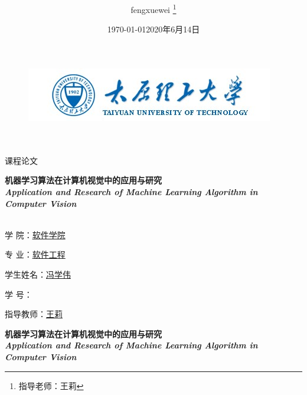 \documentclass[UTF8,a4paper,10pt,nocolorlinks]{ctexart}
\title{\textbf{}}
\author{ fengxuewei \thanks{指导老师：王莉} }
\date{\today}
\DeclareRobustCommand{\sanhao}{\fontsize{16pt}{\baselineskip}\selectfont}  %
\begin{document}
\begin{figure}[t]
    \parbox[b]{1cm}{
        \includegraphics[width=\textwidth]{TYUT.jpg}
        }
\end{figure}

    \begin{center}
        \quad \\
        \quad \\
        \heiti \fontsize{45}{17} 课\quad 程\quad 论\quad 文
        \vskip 3.5cm	
        \begin{center}
            \huge{\textbf{机器学习算法在计算机视觉中的应用与研究}}\\
            \emph{\Large{\textbf{Application and Research of Machine Learning Algorithm in Computer Vision}}}\\
        \end{center}
    \end{center}
        \vskip 3.5cm
    \begin{center}
        \songti \fontsize{15}{15}
        \doublespacing
        \quad
        \sanhao \\
        学\hspace{1cm}  院：\underline{\qquad 软件学院 \quad}

        专\hspace{1cm}  业：\underline{\qquad 软件工程 \quad} 

        学生姓名：\underline{\qquad 冯学伟 \qquad }     

        学\hspace{1cm} 号：\underline{\quad}

        指导教师：\underline{\qquad 王\hspace{0.5em}莉 \qquad}
        \centering
        \date{2020年6月14日}
    \end{center}

\thispagestyle{empty} %
\clearpage
	\begin{center}
        \begin{center} %
            \huge{\textbf{机器学习算法在计算机视觉中的应用与研究}}\\
            \emph{\Large{\textbf{Application and Research of Machine Learning Algorithm in Computer Vision}}}\\     
        \end{center}
    \end{center}
    
\end{document}

